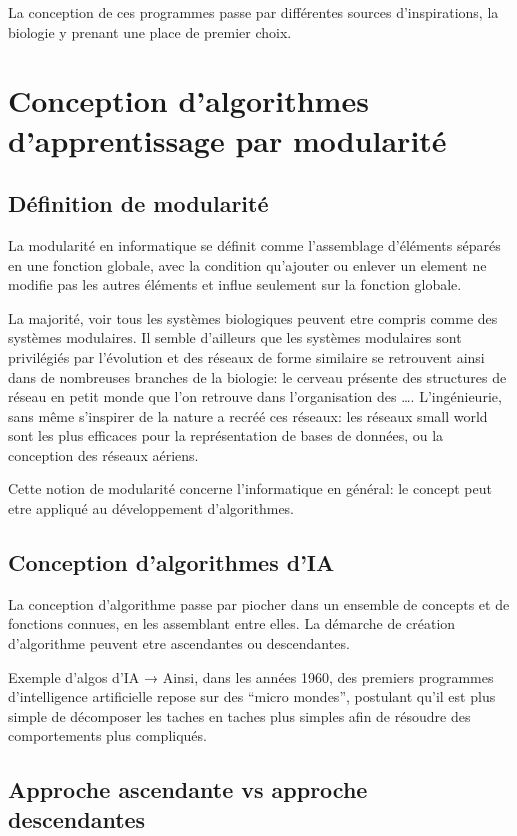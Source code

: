 \documentclass[../main]{subfiles}
\begin{document}
La conception de ces programmes passe par différentes sources d'inspirations, la biologie y prenant une place de premier choix.

\section*{Conception d'algorithmes d'apprentissage par modularité}

\subsection*{Définition de modularité}

La modularité en informatique se définit comme l'assemblage d'éléments séparés en une fonction globale, avec la condition qu'ajouter ou enlever un element ne modifie pas les autres éléments et influe seulement sur la fonction globale.

La majorité, voir tous les systèmes biologiques peuvent etre compris comme des systèmes modulaires. Il semble d'ailleurs que les systèmes modulaires sont privilégiés par l'évolution et des réseaux de forme similaire se retrouvent ainsi dans de nombreuses branches de la biologie: le cerveau présente des structures de réseau en petit monde que l'on retrouve dans l'organisation des ….
L'ingénieurie, sans même s'inspirer de la nature a recréé ces réseaux: les réseaux small world sont les plus efficaces pour la représentation de bases de données, ou la conception des réseaux aériens.
	
Cette notion de modularité concerne l'informatique en général: le concept peut etre appliqué au développement d'algorithmes.


\subsection*{Conception d'algorithmes d'IA}

La conception d'algorithme passe par piocher dans un ensemble de concepts et de fonctions connues, en les assemblant entre elles. 
La démarche de création d'algorithme peuvent etre ascendantes ou descendantes. 

Exemple d'algos d'IA → 
Ainsi, dans les années 1960, des premiers programmes d'intelligence artificielle repose sur des “micro mondes”, postulant qu'il est plus simple de décomposer les taches en taches plus simples afin de résoudre des comportements plus compliqués.

\subsection*{Approche ascendante vs approche descendantes}
\end{document}
